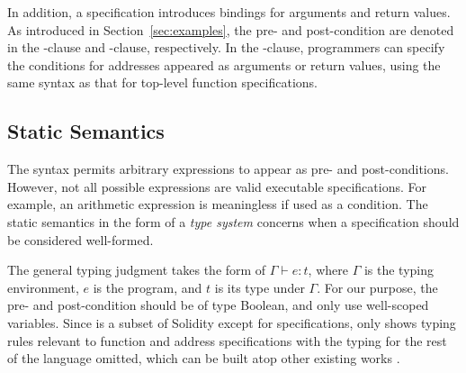In addition, a specification introduces bindings for arguments and return values.
As introduced in Section~\ref{sec:examples}, the pre- and post-condition are denoted in 
the -clause and -clause, respectively.
In the -clause, programmers can specify the conditions for addresses
appeared as arguments or return values, using the same syntax as 
that for top-level function specifications.
\iffalse
The following snippet gives a concrete example that
attaches conditions to \code{addr} for its \code{transfer} function:
\begin{lstlisting}[language=Consol]
... where { 
  IERC20(addr).transfer(amt) requires ... ensures ... 
}
\end{lstlisting}
\fi


\subsection{Static Semantics}


The syntax permits arbitrary expressions to appear as pre- and
post-conditions.
However, not all possible expressions are valid executable specifications.
For example, an arithmetic expression  
is meaningless if used as a condition.
The static semantics in the form of a \emph{type system} concerns when a 
specification should be considered well-formed.

The general typing judgment takes the form of $\Gamma \vdash e : t$, where
$\Gamma$ is the typing environment, $e$ is the program, and $t$ is its type
under $\Gamma$.
For our purpose, the pre- and post-condition should be of type Boolean,
and only use well-scoped variables.
Since \corelang is a subset of Solidity except for specifications,  only shows
typing rules relevant to function and address specifications
with
the typing for the rest of the language omitted,
which can be built atop other existing works \cite{DBLP:conf/sp/JiaoK0S0020, Sergey2021, DBLP:conf/esorics/BartolettiGM19, DBLP:conf/fc/CrafaPZ19}.


